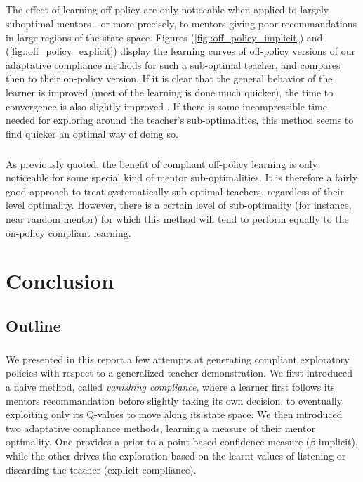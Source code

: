 \documentclass[a4paper]{report}
\begin{document}
{{{			\paragraph{} The effect of learning off-policy are only noticeable when applied to largely suboptimal mentors - or more precisely, to mentors giving poor recommandations in large regions of the state space. Figures (\ref{fig::off_policy_implicit}) and (\ref{fig::off_policy_explicit}) display the learning curves of off-policy versions of our adaptative compliance methods for such a sub-optimal teacher, and compares then to their on-policy version. If it is clear that the general behavior of the learner is improved (most of the learning is done much quicker), the time to convergence is also slightly improved . If there is some incompressible time needed for exploring around the teacher's sub-optimalities, this method seems to find quicker an optimal way of doing so. 
			
			\paragraph{} As previously quoted, the benefit of compliant off-policy learning is only noticeable for some special kind of mentor sub-optimalities. It is therefore a fairly good approach to treat systematically sub-optimal teachers, regardless of their level optimality. However, there is a certain level of sub-optimality (for instance, near random mentor) for which this method will tend to perform equally to the on-policy compliant learning. 
				
		}
	}
	
	\chapter*{Conclusion}
	{
		\section{Outline}
		{
			\paragraph{} We presented in this report a few attempts at generating compliant exploratory policies with respect to a generalized teacher demonstration. We first introduced a naive method, called \emph{vanishing compliance}, where a learner first follows its mentors recommandation before slightly taking its own decision, to eventually exploiting only its Q-values to move along its state space. We then introduced two adaptative compliance methods, learning a measure of their mentor optimality. One provides a prior to a point based confidence measure ($\beta$-implicit), while the other drives the exploration based on the learnt values of listening or discarding the teacher (explicit compliance).
			
}}}
\end{document}
